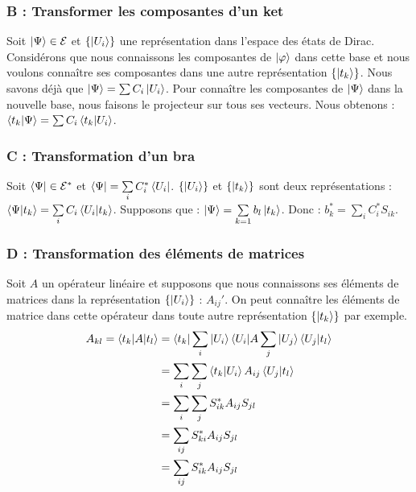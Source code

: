 \documentclass[12pt,a4paper,titlepage]{book}
\begin{document}
\subsubsection{B : Transformer les composantes d'un ket}

Soit $\ket{\Psi} \in \mathcal{E}$ et $\left\lbrace \ket{U_i} \right\rbrace$ une représentation dans l'espace des états de Dirac. Considérons que nous connaissons les composantes de $\ket{\varphi}$ dans cette base et nous voulons connaître ses composantes dans une autre représentation $\left\lbrace \ket{t_k} \right\rbrace$. Nous savons déjà que $\ket{\Psi} = \sum C_i \ket{U_i}$. Pour connaître les composantes de $\ket{\Psi}$ dans la nouvelle base, nous faisons le projecteur sur tous ses vecteurs. Nous obtenons : $\braket{t_k | \Psi} = \sum C_i \braket{t_k | U_i}$.

\subsubsection{C : Transformation d'un bra}

Soit $\bra{\Psi} \in \mathcal{E}^*$ et $\bra{\Psi} = \sum\limits_i C_i^* \bra{U_i}$. $\left\lbrace \ket{U_i} \right\rbrace$ et $\left\lbrace \ket{t_k} \right\rbrace$ sont deux représentations : $\braket{\Psi | t_k} = \sum\limits_i C_i \braket{U_i | t_k}$. Supposons que : $\ket{\Psi} = \sum\limits_{k = 1} b_l \ket{t_k}$. Donc : $b_k^* = \sum\limits_i C_i^* S_{ik}$.

\subsubsection{D : Transformation des éléments de matrices}

Soit $A$ un opérateur linéaire et supposons que nous connaissons ses éléments de matrices dans la représentation $\left\lbrace \ket{U_i} \right\rbrace$ : $A_{ij}'$. On peut connaître les éléments de matrice dans cette opérateur dans toute autre représentation $\left\lbrace \ket{t_k} \right\rbrace$ par exemple.
\begin{align*}
A_{kl} = \braket{t_k | A | t_l} &= \braket{t_k | \sum\limits_i | U_i} \braket{U_i | A \sum\limits_j | U_j} \braket{U_j | t_l}\\
&= \sum\limits_i \sum\limits_j \braket{t_k | U_i} A_{ij} \braket{U_j | t_l}\\
&= \sum\limits_i \sum\limits_j S_{ik}^* A_{ij} S_{jl}\\
&= \sum\limits_{ij} S_{ki}^* A_{ij} S_{jl}\\
&= \sum\limits_{ij} S_{ik}^* A_{ij} S_{jl}
\end{align*}
\end{document}
